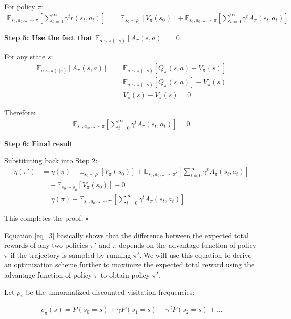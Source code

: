 For policy $\pi$:
\begin{align}
\mathbb{E}_{s_0, a_0, \ldots \sim \pi} \left[ \sum_{t = 0}^{\infty} \gamma^t r(s_t, a_t) \right] &= \mathbb{E}_{s_0 \sim \rho_0} [V_\pi(s_0)] + \mathbb{E}_{s_0, a_0, \ldots \sim \pi} \left[ \sum_{t = 0}^{\infty} \gamma^t A_\pi(s_t, a_t) \right]
\end{align}

\textbf{Step 5: Use the fact that $\mathbb{E}_{a \sim \pi(.|s)}[A_\pi(s,a)] = 0$}

For any state $s$:
\begin{align}
\mathbb{E}_{a \sim \pi(.|s)}[A_\pi(s,a)] &= \mathbb{E}_{a \sim \pi(.|s)}[Q_\pi(s,a) - V_\pi(s)] \\
&= \mathbb{E}_{a \sim \pi(.|s)}[Q_\pi(s,a)] - V_\pi(s) \\
&= V_\pi(s) - V_\pi(s) = 0
\end{align}

Therefore:
\begin{align}
\mathbb{E}_{s_0, a_0, \ldots \sim \pi} \left[ \sum_{t = 0}^{\infty} \gamma^t A_\pi(s_t, a_t) \right] = 0
\end{align}

\textbf{Step 6: Final result}

Substituting back into Step 2:
\begin{align}
\eta(\pi') &= \eta(\pi) + \mathbb{E}_{s_0 \sim \rho_0} [V_\pi(s_0)] + \mathbb{E}_{s_0, a_0, \ldots \sim \pi'} \left[ \sum_{t = 0}^{\infty} \gamma^t A_\pi(s_t, a_t) \right] \\
&\quad - \mathbb{E}_{s_0 \sim \rho_0} [V_\pi(s_0)] - 0 \\
&= \eta(\pi) + \mathbb{E}_{s_0, a_0, \ldots \sim \pi'} \left[ \sum_{t = 0}^{\infty} \gamma^t A_\pi(s_t, a_t) \right]
\end{align}

This completes the proof. $\square$

Equation \ref{eq_3} basically shows that the difference between the expected total rewards of any two policies $\pi'$ and $\pi$ depends on the advantage function of policy $\pi$ if the trajectory is sampled by running $\pi'$. We will use this equation to derive an optimization scheme further to maximize the expected total reward using the advantage function of policy $\pi$ to obtain policy $\pi'$.

Let $\rho_\pi$ be the unnormalized discounted visitation frequencies:

\begin{align*}
    \rho_\pi(s) = P(s_0 = s)+\gamma P(s_1 = s) + \gamma^2 P(s_2 = s) + \ldots
\end{align*}

